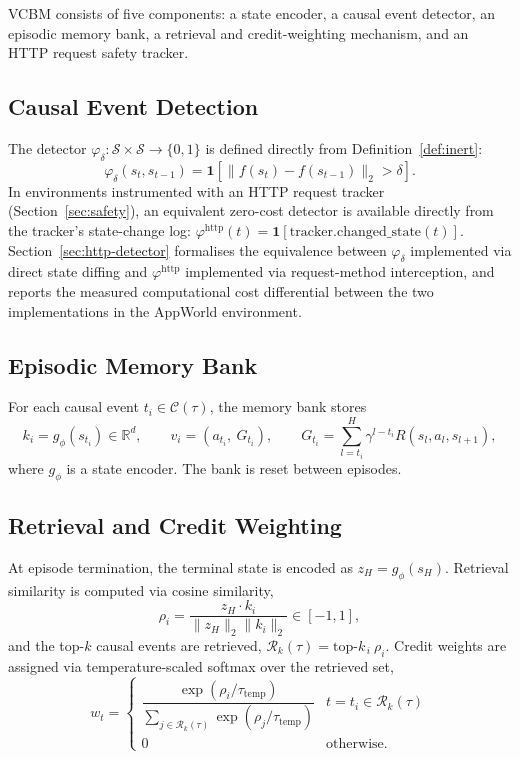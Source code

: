 \documentclass[11pt]{article}
\begin{document}
VCBM consists of five components: a state encoder, a causal event detector, an
episodic memory bank, a retrieval and credit-weighting mechanism, and an HTTP
request safety tracker.

\subsection{Causal Event Detection}

The detector $\varphi_\delta: \mathcal{S} \times \mathcal{S} \rightarrow \{0,1\}$
is defined directly from Definition~\ref{def:inert}:
\begin{equation}
\varphi_\delta(s_t, s_{t-1}) = \mathbf{1}\left[\|f(s_t) - f(s_{t-1})\|_2 > \delta\right].
\end{equation}
In environments instrumented with an HTTP request tracker (Section~\ref{sec:safety}),
an equivalent zero-cost detector is available directly from the tracker's
state-change log: $\varphi^{\mathrm{http}}(t) = \mathbf{1}[\mathrm{tracker.changed\_state}(t)]$.
Section~\ref{sec:http-detector} formalises the equivalence between
$\varphi_\delta$ implemented via direct state diffing and
$\varphi^{\mathrm{http}}$ implemented via request-method interception, and
reports the measured computational cost differential between the two
implementations in the AppWorld environment.

\subsection{Episodic Memory Bank}

For each causal event $t_i \in \mathcal{C}(\tau)$, the memory bank stores
\begin{equation}
k_i = g_\phi(s_{t_i}) \in \mathbb{R}^d, \qquad
v_i = (a_{t_i},\ G_{t_i}), \qquad
G_{t_i} = \sum_{l=t_i}^{H} \gamma^{l-t_i} R(s_l, a_l, s_{l+1}),
\end{equation}
where $g_\phi$ is a state encoder. The bank is reset between episodes.

\subsection{Retrieval and Credit Weighting}

At episode termination, the terminal state is encoded as $z_H = g_\phi(s_H)$.
Retrieval similarity is computed via cosine similarity,
\begin{equation}
\rho_i = \frac{z_H \cdot k_i}{\|z_H\|_2 \|k_i\|_2} \in [-1,1],
\end{equation}
and the top-$k$ causal events are retrieved,
$\mathcal{R}_k(\tau) = \mathrm{top}\text{-}k_{\,i}\ \rho_i$.
Credit weights are assigned via temperature-scaled softmax over the retrieved
set,
\begin{equation}
w_t = \begin{cases}
\dfrac{\exp(\rho_i / \tau_{\mathrm{temp}})}{\sum_{j \in \mathcal{R}_k(\tau)} \exp(\rho_j / \tau_{\mathrm{temp}})} & t = t_i \in \mathcal{R}_k(\tau) \\[8pt]
0 & \text{otherwise}.
\end{cases}
\end{equation}
\end{document}
